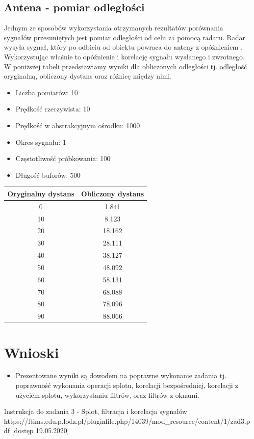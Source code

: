 \documentclass[12pt]{article}
\begin{document}
\subsection{Antena - pomiar odległości}
Jednym ze sposobów wykorzystania otrzymanych rezultatów porównania sygnałów przesuniętych jest pomiar odległości od celu za pomocą radaru. Radar wysyła sygnał, który po odbiciu od obiektu powraca do anteny z opóźnieniem . Wykorzystując właśnie to opóźnienie i korelację sygnału wysłanego i zwrotnego. W poniższej tabeli przedstawiamy wyniki dla obliczonych odległości tj. odległość oryginalną, obliczony dystans oraz różnicę między nimi.
\\
\begin{itemize}
\item Liczba pomiarów: 10
\item Prędkość rzeczywista: 10
\item Prędkość w abstrakcyjnym ośrodku: 1000
\item Okres sygnału: 1
\item Częstotliwość próbkowania: 100
\item Długość buforów: 500
\end{itemize}

\begin{center}
 \begin{tabular}{||c c ||} 
 \hline
 Oryginalny dystans & Obliczony dystans  \\ [0.5ex] 
 \hline\hline
 0 & 1.841  \\ 
 \hline
 10 & 8.123  \\
 \hline
 20 & 18.162 \\
 \hline
 30 & 28.111 \\
 \hline
 40 & 38.127 \\ 
 \hline
 50 &48.092  \\ 
 \hline
 60 & 58.131  \\
 \hline
 70 & 68.088  \\
 \hline
 80 & 78.096  \\
 \hline
 90 & 88.066  \\ 
 \hline
\end{tabular}
\end{center}


\section{Wnioski}
\begin {itemize}
\item Prezentowane wyniki są dowodem na poprawne wykonanie zadania tj. poprawność wykonania operacji splotu, korelacji bezpośredniej, korelacji z użyciem splotu, wykorzystaniu filtrów, oraz filtrów z oknami.
\end {itemize}


\begin{thebibliography}{0}
 Instrukcja do zadania 3 - Splot, filtracja i korelacja sygnałów https://ftims.edu.p.lodz.pl/pluginfile.php/14039/mod\_resource/content/1/zad3.pdf [dostęp 19.05.2020]

\end{thebibliography}
\end{document}
